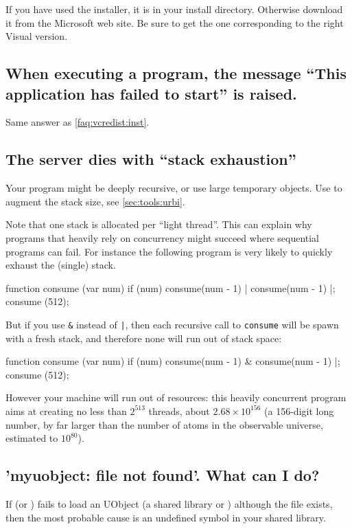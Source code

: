 If you have used the \usdk installer, it is  in
your install directory.  Otherwise download it from the Microsoft web site.
Be sure to get the one corresponding to the right Visual \Cxx version.

\subsection{When executing a program, the message ``This application has
  failed to start'' is raised.}

Same answer as \autoref{faq:vcredist:inst}.

\subsection{The server dies with ``stack exhaustion''}
Your program might be deeply recursive, or use large temporary
objects.  Use  to augment the stack size, see
\autoref{sec:tools:urbi}.

Note that one stack is allocated per ``light thread''.  This can
explain why programs that heavily rely on concurrency might succeed
where sequential programs can fail.  For instance the following
program is very likely to quickly exhaust the (single) stack.

\begin{urbiunchecked}
function consume (var num)
{
  if (num)
    consume(num - 1) | consume(num - 1)
}|;
consume (512);
\end{urbiunchecked}

But if you use \lstinline{&} instead of \lstinline{|}, then each recursive
call to \lstinline{consume} will be spawn with a fresh stack, and therefore
none will run out of stack space:

\begin{urbiunchecked}
function consume (var num)
{
  if (num)
    consume(num - 1) & consume(num - 1)
}|;
consume (512);
\end{urbiunchecked}

However your machine will run out of resources: this heavily
concurrent program aims at creating no less than $2^{513}$ threads,
about $2.68 \times 10^{156}$ (a 156-digit long number, by far larger
than the number of atoms in the observable universe, estimated to
$10^{80}$).

\subsection{'myuobject: file not found'. What can I do?}
If  (or ) fails to load an UObject (a
shared library or ) although the file exists, then the most
probable cause is an undefined symbol in your shared library.

